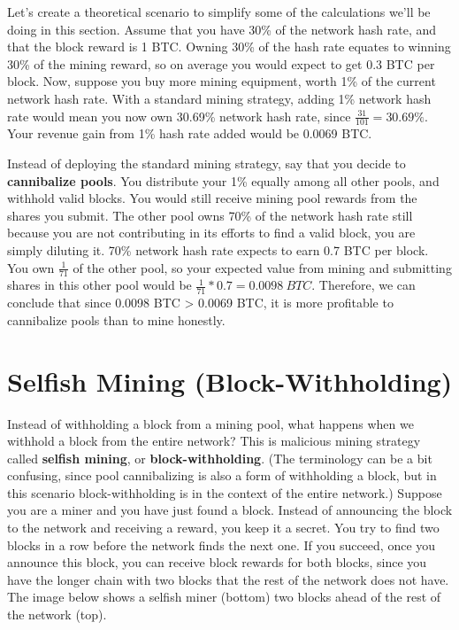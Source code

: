 \documentclass[full.tex]{subfiles}
\begin{document}
    Let's create a theoretical scenario to simplify some of the calculations we'll be doing in this section. Assume that you have 30\% of the network hash rate, and that the block reward is 1 BTC. Owning 30\% of the hash rate equates to winning 30\% of the mining reward, so on average you would expect to get 0.3 BTC per block. Now, suppose you buy more mining equipment, worth 1\% of the current network hash rate. With a standard mining strategy, adding 1\% network hash rate would mean you now own 30.69\% network hash rate, since $\frac{31}{101} = 30.69\%$. Your revenue gain from 1\% hash rate added would be 0.0069 BTC. 
    
    Instead of deploying the standard mining strategy, say that you decide to \textbf{cannibalize pools}. You distribute your 1\% equally among all other pools, and withhold valid blocks. You would still receive mining pool rewards from the shares you submit. The other pool owns 70\% of the network hash rate still because you are not contributing in its efforts to find a valid block, you are simply diluting it. 70\% network hash rate expects to earn 0.7 BTC per block. You own $\frac{1}{71}$ of the other pool, so your expected value from mining and submitting shares in this other pool would be $\frac{1}{71} * 0.7 = 0.0098~BTC$. Therefore, we can conclude that since 0.0098 BTC > 0.0069 BTC, it is more profitable to cannibalize pools than to mine honestly.
    
    \section*{Selfish Mining (Block-Withholding)}
    
    Instead of withholding a block from a mining pool, what happens when we withhold a block from the entire network? This is malicious mining strategy called \textbf{selfish mining}, or \textbf{block-withholding}. (The terminology can be a bit confusing, since pool cannibalizing is also a form of withholding a block, but in this scenario block-withholding is in the context of the entire network.) Suppose you are a miner and you have just found a block. Instead of announcing the block to the network and receiving a reward, you keep it a secret. You try to find two blocks in a row before the network finds the next one. If you succeed, once you announce this block, you can receive block rewards for both blocks, since you have the longer chain with two blocks that the rest of the network does not have. The image below shows a selfish miner (bottom) two blocks ahead of the rest of the network (top).
    
\end{document}
